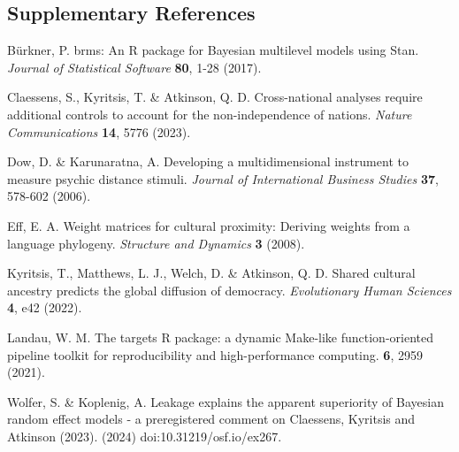 \documentclass[
  11pt,
]{article}
\begin{document}
\subsection*{Supplementary References}

Bürkner, P. brms: An R package for Bayesian multilevel models using Stan. 
\textit{Journal of Statistical Software} \textbf{80}, 1-28 (2017).

Claessens, S., Kyritsis, T. \& Atkinson, Q. D. Cross-national analyses require 
additional controls to account for the non-independence of nations.
\textit{Nature Communications} \textbf{14}, 5776 (2023).

Dow, D. \& Karunaratna, A. Developing a multidimensional instrument to measure 
psychic distance stimuli. \textit{Journal of International Business Studies}
\textbf{37}, 578-602 (2006).

Eff, E. A. Weight matrices for cultural proximity: Deriving weights from a 
language phylogeny. \textit{Structure and Dynamics} \textbf{3} (2008).

Kyritsis, T., Matthews, L. J., Welch, D. \& Atkinson, Q. D. Shared cultural 
ancestry predicts the global diffusion of democracy. \textit{Evolutionary Human 
Sciences} \textbf{4}, e42 (2022).

Landau, W. M. The targets R package: a dynamic Make-like function-oriented
pipeline toolkit for reproducibility and high-performance computing.
 \textbf{6}, 2959 (2021).

Wolfer, S. \& Koplenig, A. Leakage explains the apparent superiority of Bayesian
random effect models - a preregistered comment on Claessens, Kyritsis and 
Atkinson (2023). (2024) doi:10.31219/osf.io/ex267.
\end{document}
